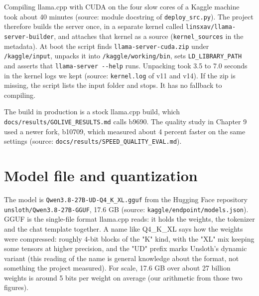 \documentclass[11pt,a4paper]{report}
\begin{document}
Compiling llama.cpp with CUDA on the four slow cores of a Kaggle machine took about 40 minutes (source: module docstring of \texttt{deploy\_\allowbreak{}src.\allowbreak{}py}). The project therefore builds the server once, in a separate kernel called \texttt{linsxav/\allowbreak{}llama-\allowbreak{}server-\allowbreak{}builder}, and attaches that kernel as a source (\texttt{kernel\_\allowbreak{}sources} in the metadata). At boot the script finds \texttt{llama-\allowbreak{}server-\allowbreak{}cuda.\allowbreak{}zip} under \texttt{/\allowbreak{}kaggle/\allowbreak{}input}, unpacks it into \texttt{/\allowbreak{}kaggle/\allowbreak{}working/\allowbreak{}bin}, sets \texttt{LD\_\allowbreak{}LIBRARY\_\allowbreak{}PATH} and asserts that \texttt{llama-\allowbreak{}server -\allowbreak{}-\allowbreak{}help} runs. Unpacking took 3.5 to 7.0 seconds in the kernel logs we kept (source: \texttt{kernel.\allowbreak{}log} of v11 and v14). If the zip is missing, the script lists the input folder and stops. It has no fallback to compiling.

The build in production is a stock llama.cpp build, which \texttt{docs/\allowbreak{}results/\allowbreak{}GOLIVE\_\allowbreak{}RESULTS.\allowbreak{}md} calls b9690. The quality study in Chapter 9 used a newer fork, b10709, which measured about 4 percent faster on the same settings (source: \texttt{docs/\allowbreak{}results/\allowbreak{}SPEED\_\allowbreak{}QUALITY\_\allowbreak{}EVAL.\allowbreak{}md}).

\section{Model file and quantization}

The model is \texttt{Qwen3.\allowbreak{}8-\allowbreak{}27B-\allowbreak{}UD-\allowbreak{}Q4\_\allowbreak{}K\_\allowbreak{}XL.\allowbreak{}gguf} from the Hugging Face repository \texttt{unsloth/\allowbreak{}Qwen3.\allowbreak{}8-\allowbreak{}27B-\allowbreak{}GGUF}, 17.6 GB (source: \texttt{kaggle/\allowbreak{}endpoint/\allowbreak{}models.\allowbreak{}json}). GGUF is the single-file format llama.cpp reads: it holds the weights, the tokenizer and the chat template together. A name like Q4\_K\_XL says how the weights were compressed: roughly 4-bit blocks of the "K" kind, with the "XL" mix keeping some tensors at higher precision, and the "UD" prefix marks Unsloth's dynamic variant (this reading of the name is general knowledge about the format, not something the project measured). For scale, 17.6 GB over about 27 billion weights is around 5 bits per weight on average (our arithmetic from those two figures).
\end{document}
